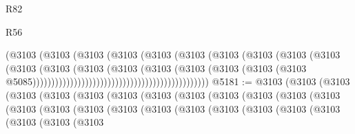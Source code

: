 \begin{lexlean}{R82}
\begin{lexlean}{R56}
\begin{coremodule}
{{{{{{{{{{{{{{{{{{{{{{{{{{{{{{{{{{{{{{{{{{{{{{{{{{{{{{{{{{{{{{{{{{{{{{{{{{{{{{{{{{{{{{{{{{{{{{{{{{{{{{{{{{{{{{{{{{{{{{{{{{{{{{{{{{{{{{{{{{{{{{{{{{{{{{{{{{{{{{{{{{{{{{{{{{{{{{{{{{{{{{{{{{{{{{{{{{{{{{{{{{{{{{{{{{{                                                            (@3103
                                                              (@3103
                                                                (@3103
                                                                  (@3103
                                                                    (@3103
                                                                      (@3103
                                                                        (@3103
                                                                          (@3103
                                                                            (@3103
                                                                              (@3103
                                                                                (@3103
                                                                                  (@3103
                                                                                    (@3103
                                                                                      (@3103
                                                                                        (@3103
                                                                                          (@3103
                                                                                            (@3103
                                                                                              (@3103
                                                                                                (@3103
                                                                                                  @5085)))))))))))))))))))))))))))))))))))))))))))))))
@5181 := @3103
    (@3103
      (@3103
        (@3103
          (@3103
            (@3103
              (@3103
                (@3103
                  (@3103
                    (@3103
                      (@3103
                        (@3103
                          (@3103
                            (@3103
                              (@3103
                                (@3103
                                  (@3103
                                    (@3103
                                      (@3103
                                        (@3103
                                          (@3103
                                            (@3103
                                              (@3103
                                                (@3103
                                                  (@3103
                                                    (@3103
}}}}}}}}}}}}}}}}}}}}}}}}}}}}}}}}}}}}}}}}}}}}}}}}}}}}}}}}}}}}}}}}}}}}}}}}}}}}}}}}}}}}}}}}}}}}}}}}}}}}}}}}}}}}}}}}}}}}}}}}}}}}}}}}}}}}}}}}}}}}}}}}}}}}}}}}}}}}}}}}}}}}}}}}}}}}}}}}}}}}}}}}}}}}}}}}}}}}}}}}}}}}}}}}}}}
\end{coremodule}
\end{lexlean}
\end{lexlean}
